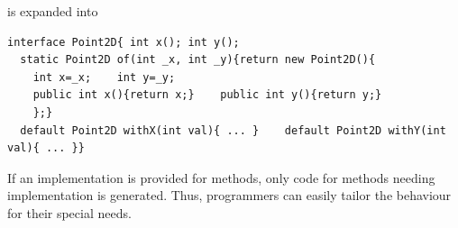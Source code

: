 \noindent is expanded into
\begin{lstlisting}
interface Point2D{ int x(); int y();
  static Point2D of(int _x, int _y){return new Point2D(){
    int x=_x;    int y=_y;
    public int x(){return x;}    public int y(){return y;}
    };}
  default Point2D withX(int val){ ... }    default Point2D withY(int val){ ... }}
\end{lstlisting}

\noindent If an implementation is provided for methods,
only code for methods needing implementation is generated. Thus,
programmers can easily tailor the behaviour for their special needs.





%

